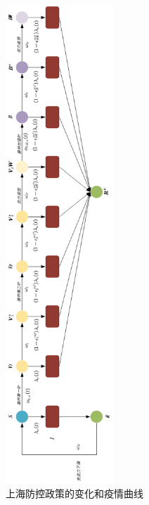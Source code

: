 \documentclass[bwprint]{gmcmthesis}
\numberwithin{figure}{section}
\begin{document}
\begin{figure}[!h]
\centering
\includegraphics[width=0.36\textwidth]{vaccine.png}
\caption{上海防控政策的变化和疫情曲线}
\label{fig3}
\end{figure}
\end{document}
